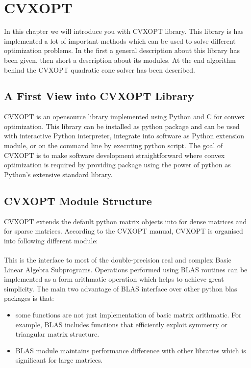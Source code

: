 
\chapter{CVXOPT} %

\label{chptr:cvxopt} %

In this chapter we will introduce you with CVXOPT library. This library is has implemented a lot of important methods which can be used to solve different optimization problems. In the first a general description about this library has been given, then short a description about its modules. At the end algorithm behind the CVXOPT quadratic cone solver has been described.
  
\section{A First View into CVXOPT Library}

CVXOPT is an opensource  library implemented using Python and C for convex optimization. This library can be installed as python package and can be used with interactive Python interpreter, integrate into software as Python extension module, or on the command line by executing python script. The goal of CVXOPT is to make software development straightforward where convex optimization is required by providing package using the power of python as Python's extensive standard library.


\section{CVXOPT Module Structure}
CVXOPT extends the default python matrix objects into  for dense matrices and  for sparse matrices. According to the CVXOPT manual, CVXOPT is organised into following different module:

\subsubsection*{}
This is the interface to most of the double-precision real and complex  Basic Linear Algebra Subprograms. Operations performed using BLAS routines can be implemented as a form arithmatic operation which helps to achieve great simplicity. The main two advantage of BLAS interface over other python blas packages is that:
\begin{itemize}
	\item some functions are not just implementation of basic matrix arithmatic. For example, BLAS includes functions that efficiently exploit symmetry or triangular matrix structure.
	\item BLAS module maintains performance difference with other libraries which is significant for large matrices.
\end{itemize}


